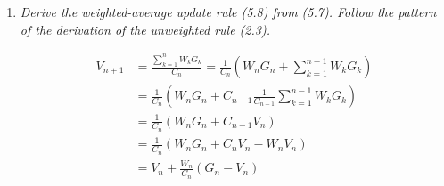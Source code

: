 \documentclass[12pt,a4paper]{article}
\begin{document}
\begin{enumerate}
  \newpage
  \item
    \textit{Derive the weighted-average update rule (5.8) from (5.7). Follow the
    pattern of the derivation of the unweighted rule (2.3).}

    \begin{align*}
      V_{n + 1} &= \frac{\sum\limits_{k = 1}^n W_k G_k}{C_n}
      = \frac{1}{C_n} \left( W_n G_n + \sum\limits_{k = 1}^{n - 1} W_k G_k\right)\\
      &= \frac{1}{C_n} \left( W_n G_n + C_{n - 1} \frac{1}{C_{n - 1}} \sum\limits_{k = 1}^{n - 1} W_k G_k \right)\\
      &= \frac{1}{C_n} \left( W_n G_n + C_{n - 1} V_n \right)\\
      &= \frac{1}{C_n} \left( W_n G_n + C_n V_n  - W_n V_n\right)\\
      &= V_n + \frac{W_n}{C_n} (G_n - V_n)\\
    \end{align*}
\end{enumerate}
\end{document}
